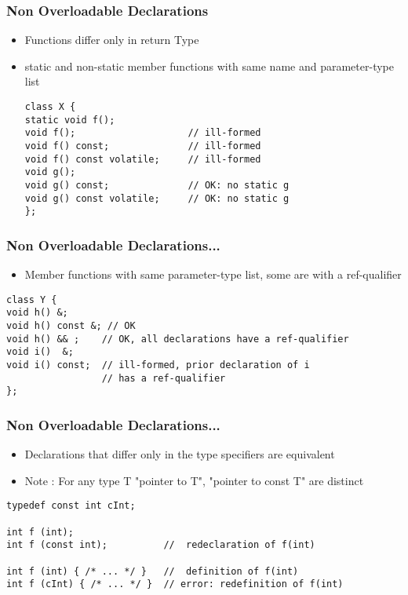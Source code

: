 \documentclass{beamer}
\begin{document}
\begin{frame}[fragile]
\frametitle{Non Overloadable Declarations}

\begin{itemize}
\item Functions differ only in return Type
\item static and non-static member functions with same name and parameter-type list
\begin{example}
\begin{lstlisting}
class X {
static void f();
void f();                    // ill-formed
void f() const;              // ill-formed
void f() const volatile;     // ill-formed
void g();
void g() const;              // OK: no static g
void g() const volatile;     // OK: no static g
};

\end{lstlisting}
\end{example}
\end{itemize}
\end{frame}


\begin{frame}[fragile]
\frametitle{Non Overloadable Declarations...}

\begin{itemize}
\item Member functions with same parameter-type list, some are with a ref-qualifier
\end{itemize}
\begin{example}
\begin{lstlisting}
class Y {
void h() &;
void h() const &; // OK
void h() && ;    // OK, all declarations have a ref-qualifier  
void i()  &;
void i() const;  // ill-formed, prior declaration of i 
                 // has a ref-qualifier
};
\end{lstlisting}
\end{example}

\end{frame}



\begin{frame}[fragile]
\frametitle{Non Overloadable Declarations...}

\begin{itemize}
\item Declarations that differ only in the type specifiers are equivalent
\item Note : For any type T "pointer to T", "pointer to const T" are distinct
\end{itemize}
\begin{example}
\begin{lstlisting}
typedef const int cInt;

int f (int);
int f (const int);          //  redeclaration of f(int)

int f (int) { /* ... */ }   //  definition of f(int)
int f (cInt) { /* ... */ }  // error: redefinition of f(int)
\end{lstlisting}
\end{example}
\end{frame}
\end{document}
